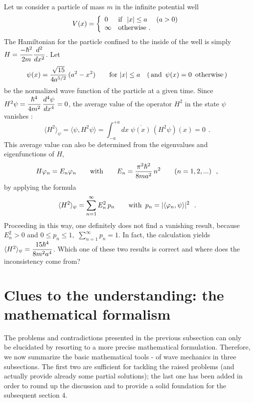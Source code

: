 \documentclass[a4wide,12pt]{report}
\begin{document}
Let us consider a particle of mass $m$ in the infinite potential well  
\[
V(x) = \left\{
\begin{array}{ll}
0
& {\rm if} \ \; |x| \leq a \quad  \ (a >0)
\\
\infty
& {\rm otherwise} \ .
\end{array}
\right.
\]
The Hamiltonian for the particle confined to the inside of the well 
is simply 
$H = \displaystyle{-\hbar^2 \over 2m}
\displaystyle{d^2 \over dx^2}$.
Let
\begin{equation}
\label{psi}
\psi(x) =
\displaystyle{\sqrt{15} \over 4 a^{5/2}} \, (a^2 - x^2) \qquad
{\rm for} \ |x| \leq a \quad  (\, {\rm and} \ \, \psi (x) =0 \ \,
{\rm otherwise} \, )
\end{equation}
be the normalized wave function of the particle at a given time. 
Since $H^2 \psi =
\displaystyle{\hbar^4 \over 4 m^2} \, \displaystyle{d^4 \psi \over dx^4} =0$,
the average value of the operator 
$H^2$ in the state $\psi$
vanishes :
\begin{equation}
\label{caf}
\langle H^2 \rangle_{\psi} = \langle \psi, H^2 \psi \rangle
= \int_{-a}^{+a} dx \; \overline{\psi (x)} \, (H^2  \psi)(x) = 0
\ \ .
\end{equation}
This average value can also be determined from the eigenvalues and 
eigenfunctions of $H$,
\begin{equation}
\label{pui}
H \varphi_n = E_n \varphi_n
\qquad {\rm with} \qquad
E_n = \displaystyle{\pi^2 \hbar^2 \over 8ma^2} \, n^2
\qquad (n=1,2,...)
\ \ ,
\end{equation}
by applying the formula 
\begin{equation}
\langle H^2 \rangle_{\psi} = \sum_{n=1}^{\infty} E_n^2 \, p_n
\qquad {\rm with} \ \, p_n = | \langle \varphi_n ,\psi \rangle | ^2
\ \ .
\end{equation}
Proceeding in this way, 
one definitely does not find a vanishing result, because  
$E_n^2 >0$ and $0\leq p_n \leq 1, \, \, \sum_{n=1}^{\infty} p_n =1$.
In fact, the calculation yields 
$\langle H^2 \rangle_{\psi}
= \displaystyle{15\hbar^4 \over 8m^2 a^4}$. 
Which one of these two results is correct and where does the 
inconsistency come from? \cite{grau}







\section{Clues to the understanding: the mathematical formalism}

The problems and contradictions presented in the previous 
subsection can only be elucidated by resorting to a more 
precise mathematical formulation. Therefore, we now
summarize 
the basic mathematical tools \cite{ri,sg}\cite{af}-\cite{krey}
of wave mechanics in three
subsections. 
The first two are sufficient 
for  tackling the raised problems (and actually 
provide already some 
partial solutions); the last one 
has been added in order 
to round up the discussion and to provide
a solid foundation for the subsequent section 4.  
\end{document}
